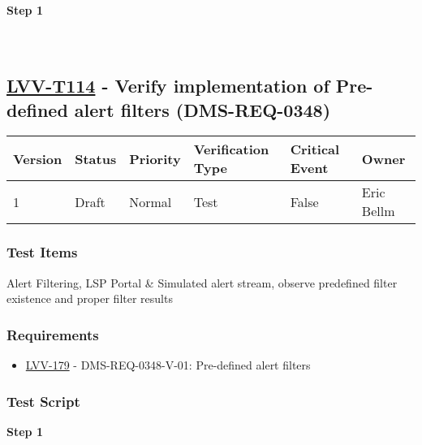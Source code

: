 \textbf{Step 1}\\
~\\
~\\

\hypertarget{lvv-t114---verify-implementation-of-pre-defined-alert-filters-dms-req-0348}{%
\subsection{\texorpdfstring{\href{https://jira.lsstcorp.org/secure/Tests.jspa\#/testCase/LVV-T114}{LVV-T114}
- Verify implementation of Pre-defined alert filters
(DMS-REQ-0348)}{LVV-T114 - Verify implementation of Pre-defined alert filters (DMS-REQ-0348)}}\label{lvv-t114---verify-implementation-of-pre-defined-alert-filters-dms-req-0348}}

\begin{longtable}[]{@{}llllll@{}}
\toprule
Version & Status & Priority & Verification Type & Critical Event &
Owner\tabularnewline
\midrule
\endhead
1 & Draft & Normal & Test & False & Eric Bellm\tabularnewline
\bottomrule
\end{longtable}

\hypertarget{test-items-14}{%
\subsubsection{Test Items}\label{test-items-14}}

Alert Filtering, LSP Portal \& Simulated alert stream, observe
predefined filter existence and proper filter results

\hypertarget{requirements-14}{%
\subsubsection{Requirements}\label{requirements-14}}

\begin{itemize}
\tightlist
\item
  \href{https://jira.lsstcorp.org/browse/LVV-179}{LVV-179} -
  DMS-REQ-0348-V-01: Pre-defined alert filters
\end{itemize}

\hypertarget{test-script-14}{%
\subsubsection{Test Script}\label{test-script-14}}

\textbf{Step 1}\\
~\\
~\\

